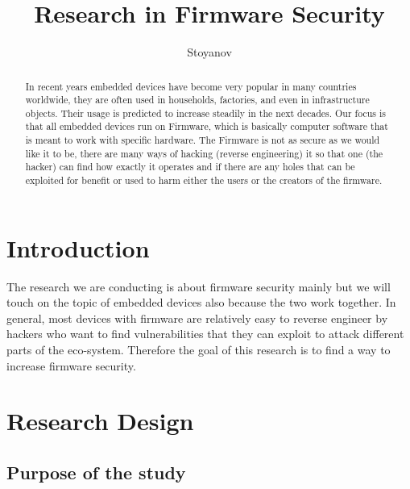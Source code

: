 \documentclass[]{report}
\title{Research in Firmware Security}
\author{Stoyanov}
\begin{document}
\maketitle

\begin{abstract}
	In recent years embedded devices have become very popular in many countries worldwide, they are often used in households, factories, and even in infrastructure objects. Their usage is predicted to increase steadily in the next decades. Our focus is that all embedded devices run on Firmware, which is basically computer software that is meant to work with specific hardware. The Firmware is not as secure as we would like it to be, there are many ways of hacking (reverse engineering) it so that one (the hacker) can find how exactly it operates and if there are any holes that can be exploited for benefit or used to harm either the users or the creators of the firmware.
\end{abstract}

\section{Introduction}
The research we are conducting is about firmware security mainly but we will touch on the topic of embedded devices also because the two work together. In general, most devices with firmware are relatively easy to reverse engineer by hackers who want to find vulnerabilities that they can exploit to attack different parts of the eco-system. Therefore the goal of this research is to find a way to increase firmware security.
\section{Research Design}
\subsection{Purpose of the study} 
\end{document}
